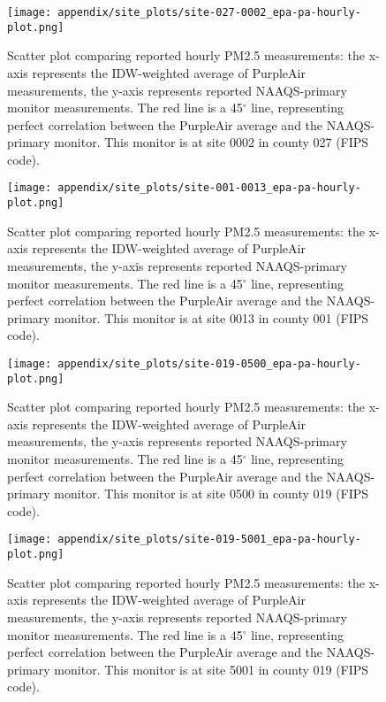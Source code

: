 \begin{figure}
\centering
\texttt{[image: appendix/site\_plots/site-027-0002\_epa-pa-hourly-plot.png]}
\caption{Scatter plot comparing reported hourly PM2.5 measurements: the x-axis represents the IDW-weighted average of PurpleAir measurements, the y-axis represents reported NAAQS-primary monitor measurements. The red line is a 45$^\circ$ line, representing perfect correlation between the PurpleAir average and the NAAQS-primary monitor. This monitor is at site 0002 in county 027 (FIPS code).}
\label{fig:pa-epa-compare_027-0002}
\end{figure}
\begin{figure}
\centering
\texttt{[image: appendix/site\_plots/site-001-0013\_epa-pa-hourly-plot.png]}
\caption{Scatter plot comparing reported hourly PM2.5 measurements: the x-axis represents the IDW-weighted average of PurpleAir measurements, the y-axis represents reported NAAQS-primary monitor measurements. The red line is a 45$^\circ$ line, representing perfect correlation between the PurpleAir average and the NAAQS-primary monitor. This monitor is at site 0013 in county 001 (FIPS code).}
\label{fig:pa-epa-compare_001-0013}
\end{figure}
\begin{figure}
\centering
\texttt{[image: appendix/site\_plots/site-019-0500\_epa-pa-hourly-plot.png]}
\caption{Scatter plot comparing reported hourly PM2.5 measurements: the x-axis represents the IDW-weighted average of PurpleAir measurements, the y-axis represents reported NAAQS-primary monitor measurements. The red line is a 45$^\circ$ line, representing perfect correlation between the PurpleAir average and the NAAQS-primary monitor. This monitor is at site 0500 in county 019 (FIPS code).}
\label{fig:pa-epa-compare_019-0500}
\end{figure}
\begin{figure}
\centering
\texttt{[image: appendix/site\_plots/site-019-5001\_epa-pa-hourly-plot.png]}
\caption{Scatter plot comparing reported hourly PM2.5 measurements: the x-axis represents the IDW-weighted average of PurpleAir measurements, the y-axis represents reported NAAQS-primary monitor measurements. The red line is a 45$^\circ$ line, representing perfect correlation between the PurpleAir average and the NAAQS-primary monitor. This monitor is at site 5001 in county 019 (FIPS code).}
\label{fig:pa-epa-compare_019-5001}
\end{figure}
